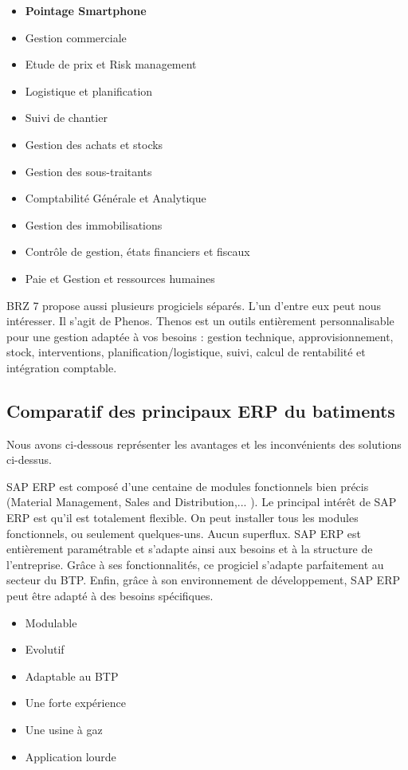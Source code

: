      \begin{itemize}
		  \item \textbf{Pointage Smartphone}
		  \item Gestion commerciale
		  \item Etude de prix et Risk management
		  \item Logistique et planification
		  \item Suivi de chantier
		  \item Gestion des achats et stocks
		  \item Gestion des sous-traitants
		  \item Comptabilité Générale et Analytique
		  \item Gestion des immobilisations
		  \item Contrôle de gestion, états financiers et fiscaux
		  \item Paie et Gestion et ressources humaines\\
		\end{itemize}
		
		BRZ 7 propose aussi plusieurs progiciels séparés. L'un d'entre eux peut nous intéresser. Il s'agit de Phenos.
    Thenos est un outils entièrement personnalisable pour une gestion adaptée à vos besoins : 
    gestion technique, approvisionnement, stock, interventions, planification/logistique, suivi, calcul de rentabilité et intégration comptable. 
		  
		
\subsection{Comparatif des principaux ERP du batiments}

Nous avons ci-dessous représenter les avantages et les inconvénients des solutions ci-dessus.


{
    SAP ERP est composé d'une centaine de modules fonctionnels bien précis (Material Management, Sales and Distribution,... ).
    Le principal intérêt de SAP ERP est qu'il est totalement flexible. On peut installer tous les modules fonctionnels, ou seulement quelques-uns.
    Aucun superflux. SAP ERP est entièrement paramétrable et s'adapte ainsi aux besoins et à la structure de l'entreprise.
    Grâce à ses fonctionnalités, ce progiciel s'adapte parfaitement au secteur du BTP.
    Enfin, grâce à son environnement de développement, SAP ERP peut être adapté à des besoins spécifiques.
}
{
    \begin{itemize}
        \item Modulable
        \item Evolutif
        \item Adaptable au BTP
        \item Une forte expérience
    \end{itemize}
}
{
    \begin{itemize}
        \item Une usine à gaz
        \item Application lourde
    \end{itemize}
}

